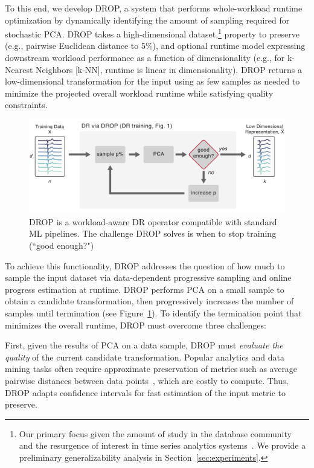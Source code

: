 To this end, we develop DROP, a system that performs whole-workload runtime optimization by dynamically identifying the amount of sampling required for stochastic PCA.
DROP takes a high-dimensional dataset,\footnote{Our primary focus  given the amount of study in the database community~\cite{keogh-study} and the resurgence of interest in time series analytics systems~\cite{macrobase,macrobase-cidr,trill-signal}. We provide a preliminary generalizability analysis in Section~\ref{sec:experiments}.}  property to preserve (e.g., pairwise Euclidean distance to 5\%), and optional runtime model expressing downstream workload performance as a function of dimensionality (e.g., for k-Nearest Neighbors [k-NN], runtime is linear in dimensionality). 
DROP returns a low-dimensional transformation for the input using as few samples as needed to minimize the projected overall workload runtime while satisfying quality constraints.

\begin{figure}
\includegraphics[width=\linewidth]{figs/basic.pdf}
\caption[]{DROP is a workload-aware DR operator compatible with standard ML pipelines. The challenge DROP solves is when to stop training (``good enough?")}
\label{fig:basic}
\end{figure}


To achieve this functionality, DROP addresses the question of how much to sample the input dataset via data-dependent progressive sampling and online progress estimation at runtime.  
DROP performs PCA on a small sample to obtain a candidate transformation, then progressively increases the number of samples until termination (see Figure~\ref{fig:basic}). 
To identify the termination point that minimizes the overall runtime, DROP must overcome three challenges:

First, given the results of PCA on a data sample, DROP must \emph{evaluate the quality} of the current candidate transformation.
Popular analytics and data mining tasks often require approximate preservation of metrics such as average pairwise distances between data points~\cite{time-series-dm,dm-book}, which are costly to compute.
Thus, DROP adapts confidence intervals for fast estimation of the input metric to preserve.


